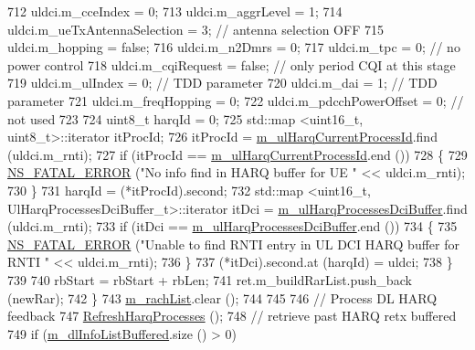 \begin{DoxyCode}
712           uldci.m\_cceIndex = 0;
713           uldci.m\_aggrLevel = 1;
714           uldci.m\_ueTxAntennaSelection = 3; \textcolor{comment}{// antenna selection OFF}
715           uldci.m\_hopping = \textcolor{keyword}{false};
716           uldci.m\_n2Dmrs = 0;
717           uldci.m\_tpc = 0; \textcolor{comment}{// no power control}
718           uldci.m\_cqiRequest = \textcolor{keyword}{false}; \textcolor{comment}{// only period CQI at this stage}
719           uldci.m\_ulIndex = 0; \textcolor{comment}{// TDD parameter}
720           uldci.m\_dai = 1; \textcolor{comment}{// TDD parameter}
721           uldci.m\_freqHopping = 0;
722           uldci.m\_pdcchPowerOffset = 0; \textcolor{comment}{// not used}
723 
724           uint8\_t harqId = 0;
725           std::map <uint16\_t, uint8\_t>::iterator itProcId;
726           itProcId = \hyperlink{classns3_1_1TdMtFfMacScheduler_a01393611d03f7107ec6c0a0db95858c2}{m\_ulHarqCurrentProcessId}.find (uldci.m\_rnti);
727           \textcolor{keywordflow}{if} (itProcId == \hyperlink{classns3_1_1TdMtFfMacScheduler_a01393611d03f7107ec6c0a0db95858c2}{m\_ulHarqCurrentProcessId}.end ())
728             \{
729               \hyperlink{group__fatal_ga5131d5e3f75d7d4cbfd706ac456fdc85}{NS\_FATAL\_ERROR} (\textcolor{stringliteral}{"No info find in HARQ buffer for UE "} << uldci.m\_rnti);
730             \}
731           harqId = (*itProcId).second;
732           std::map <uint16\_t, UlHarqProcessesDciBuffer\_t>::iterator itDci = 
      \hyperlink{classns3_1_1TdMtFfMacScheduler_a25c9425db7dae9dad47cd58ae3b70faf}{m\_ulHarqProcessesDciBuffer}.find (uldci.m\_rnti);
733           \textcolor{keywordflow}{if} (itDci == \hyperlink{classns3_1_1TdMtFfMacScheduler_a25c9425db7dae9dad47cd58ae3b70faf}{m\_ulHarqProcessesDciBuffer}.end ())
734             \{
735               \hyperlink{group__fatal_ga5131d5e3f75d7d4cbfd706ac456fdc85}{NS\_FATAL\_ERROR} (\textcolor{stringliteral}{"Unable to find RNTI entry in UL DCI HARQ buffer for RNTI "} << 
      uldci.m\_rnti);
736             \}
737           (*itDci).second.at (harqId) = uldci;
738         \}
739 
740       rbStart = rbStart + rbLen;
741       ret.m\_buildRarList.push\_back (newRar);
742     \}
743   \hyperlink{classns3_1_1TdMtFfMacScheduler_a21aef93577bc95526499ff1f0b8d98cf}{m\_rachList}.clear ();
744 
745 
746   \textcolor{comment}{// Process DL HARQ feedback}
747   \hyperlink{classns3_1_1TdMtFfMacScheduler_abd49ea34cd48b88b278f30768762dfbd}{RefreshHarqProcesses} ();
748   \textcolor{comment}{// retrieve past HARQ retx buffered}
749   \textcolor{keywordflow}{if} (\hyperlink{classns3_1_1TdMtFfMacScheduler_a4237ad4223d377a1c9963a904acbe4ad}{m\_dlInfoListBuffered}.size () > 0)

\end{DoxyCode}
